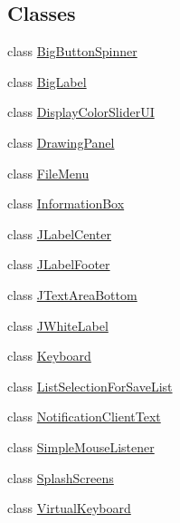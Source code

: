 \subsection*{Classes}
\begin{DoxyCompactItemize}
\item 
class \hyperlink{classgov_1_1fnal_1_1ppd_1_1dd_1_1util_1_1guiUtils_1_1BigButtonSpinner}{Big\-Button\-Spinner}
\item 
class \hyperlink{classgov_1_1fnal_1_1ppd_1_1dd_1_1util_1_1guiUtils_1_1BigLabel}{Big\-Label}
\item 
class \hyperlink{classgov_1_1fnal_1_1ppd_1_1dd_1_1util_1_1guiUtils_1_1DisplayColorSliderUI}{Display\-Color\-Slider\-U\-I}
\item 
class \hyperlink{classgov_1_1fnal_1_1ppd_1_1dd_1_1util_1_1guiUtils_1_1DrawingPanel}{Drawing\-Panel}
\item 
class \hyperlink{classgov_1_1fnal_1_1ppd_1_1dd_1_1util_1_1guiUtils_1_1FileMenu}{File\-Menu}
\item 
class \hyperlink{classgov_1_1fnal_1_1ppd_1_1dd_1_1util_1_1guiUtils_1_1InformationBox}{Information\-Box}
\item 
class \hyperlink{classgov_1_1fnal_1_1ppd_1_1dd_1_1util_1_1guiUtils_1_1JLabelCenter}{J\-Label\-Center}
\item 
class \hyperlink{classgov_1_1fnal_1_1ppd_1_1dd_1_1util_1_1guiUtils_1_1JLabelFooter}{J\-Label\-Footer}
\item 
class \hyperlink{classgov_1_1fnal_1_1ppd_1_1dd_1_1util_1_1guiUtils_1_1JTextAreaBottom}{J\-Text\-Area\-Bottom}
\item 
class \hyperlink{classgov_1_1fnal_1_1ppd_1_1dd_1_1util_1_1guiUtils_1_1JWhiteLabel}{J\-White\-Label}
\item 
class \hyperlink{classgov_1_1fnal_1_1ppd_1_1dd_1_1util_1_1guiUtils_1_1Keyboard}{Keyboard}
\item 
class \hyperlink{classgov_1_1fnal_1_1ppd_1_1dd_1_1util_1_1guiUtils_1_1ListSelectionForSaveList}{List\-Selection\-For\-Save\-List}
\item 
class \hyperlink{classgov_1_1fnal_1_1ppd_1_1dd_1_1util_1_1guiUtils_1_1NotificationClientText}{Notification\-Client\-Text}
\item 
class \hyperlink{classgov_1_1fnal_1_1ppd_1_1dd_1_1util_1_1guiUtils_1_1SimpleMouseListener}{Simple\-Mouse\-Listener}
\item 
class \hyperlink{classgov_1_1fnal_1_1ppd_1_1dd_1_1util_1_1guiUtils_1_1SplashScreens}{Splash\-Screens}
\item 
class \hyperlink{classgov_1_1fnal_1_1ppd_1_1dd_1_1util_1_1guiUtils_1_1VirtualKeyboard}{Virtual\-Keyboard}
\end{DoxyCompactItemize}
